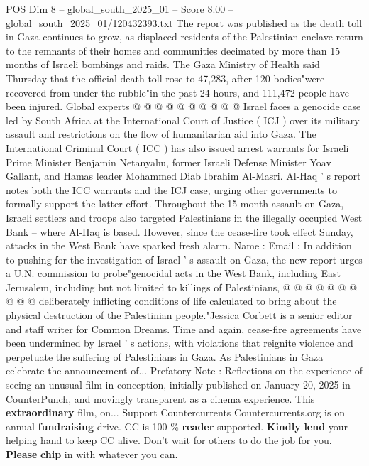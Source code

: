 \begin{textsample}{POS Dim 8 – global\_south\_2025\_01 – Score 8.00 – global\_south\_2025\_01/120432393.txt}
The report was published as the death toll in Gaza continues to grow, as displaced residents of the Palestinian enclave return to the remnants of their homes and communities decimated by more than 15 months of Israeli bombings and raids.
The Gaza Ministry of Health said Thursday that the official death toll rose to 47,283, after 120 bodies"were recovered from under the rubble"in the past 24 hours, and 111,472 people have been injured.
Global experts @ @ @ @ @ @ @ @ @ @ Israel faces a genocide case led by South Africa at the International Court of Justice ( ICJ ) over its military assault and restrictions on the flow of humanitarian aid into Gaza.
The International Criminal Court ( ICC ) has also issued arrest warrants for Israeli Prime Minister Benjamin Netanyahu, former Israeli Defense Minister Yoav Gallant, and Hamas leader Mohammed Diab Ibrahim Al-Masri.
Al-Haq ' s report notes both the ICC warrants and the ICJ case, urging other governments to formally support the latter effort.
Throughout the 15-month assault on Gaza, Israeli settlers and troops also targeted Palestinians in the illegally occupied West Bank -- where Al-Haq is based.
However, since the cease-fire took effect Sunday, attacks in the West Bank have sparked fresh alarm.
Name : Email : In addition to pushing for the investigation of Israel ' s assault on Gaza, the new report urges a U.N. commission to probe"genocidal acts in the West Bank, including East Jerusalem, including but not limited to killings of Palestinians, @ @ @ @ @ @ @ @ @ @ deliberately inflicting conditions of life calculated to bring about the physical destruction of the Palestinian people."Jessica Corbett is a senior editor and staff writer for Common Dreams.
Time and again, cease-fire agreements have been undermined by Israel ' s actions, with violations that reignite violence and perpetuate the suffering of Palestinians in Gaza.
As Palestinians in Gaza celebrate the announcement of...
Prefatory Note : Reflections on the experience of seeing an unusual film in conception, initially published on January 20, 2025 in CounterPunch, and movingly transparent as a cinema experience.
This \textbf{extraordinary} film, on...
Support Countercurrents Countercurrents.org is on annual \textbf{fundraising} drive.
CC is 100 \% \textbf{reader} supported. \textbf{Kindly} \textbf{lend} your helping hand to keep CC alive.
Don't wait for others to do the job for you. \textbf{Please} \textbf{chip} in with whatever you can.

\end{textsample}
